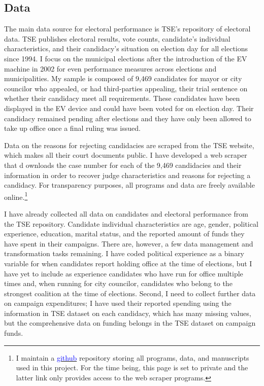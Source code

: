 \documentclass[11pt]{article}
\begin{document}
\subsection{Data} \label{subsec:data_paper1}

The main data source for electoral performance is TSE's repository of electoral data. TSE publishes electoral results, vote counts, candidate's individual characteristics, and their candidacy's situation on election day for all elections since 1994. I focus on the municipal elections after the introduction of the EV machine in 2002 for even performance measures across elections and municipalities. My sample is composed of 9,469 candidates for mayor or city councilor who appealed, or had third-parties appealing, their trial sentence on whether their candidacy meet all requirements. These candidates have been displayed in the EV device and could have been voted for on election day. Their candidacy remained pending after elections and they have only been allowed to take up office once a final ruling was issued.

Data on the reasons for rejecting candidacies are scraped from the TSE website, which makes all their court documents public. I have developed a web scraper that d ownloads the case number for each of the 9,469 candidacies and their information in order to recover judge characteristics and reasons for rejecting a candidacy. For transparency purposes, all programs and data are freely available online.\footnote{I maintain a \href{https://www.github.com/aassumpcao/tse-scraper}{\textcolor{blue}{github}} repository storing all programs, data, and manuscripts used in this project. For the time being, this page is set to private and the latter link only provides access to the web scraper programs.}

I have already collected all data on candidates and electoral performance from the TSE repository. Candidate individual characteristics are age, gender, political experience, education, marital status, and the reported amount of funds they have spent in their campaigns. There are, however, a few data management and transformation tasks remaining. I have coded political experience as a binary variable for when candidates report holding office at the time of elections, but I have yet to include as experience candidates who have run for office multiple times and, when running for city councilor, candidates who belong to the strongest coalition at the time of elections. Second, I need to collect further data on campaign expenditures; I have used their reported spending using the information in TSE dataset on each candidacy, which has many missing values, but the comprehensive data on funding belongs in the TSE dataset on campaign funds.
\end{document}
